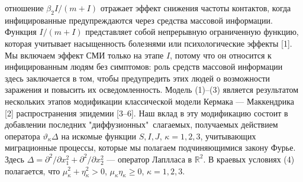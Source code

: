 отношение $\beta_2I/(m+I)$ отражает эффект снижения частоты
контактов, когда инфицированные предупреждаются через средства
массовой информации. Функция $I/(m+I)$ представляет собой
непрерывную ограниченную функцию, которая учитывает насыщенность
болезнями или психологические эффекты [1]. Мы включаем эффект СМИ
только на этапе $I$,  потому что он относится к инфицированным
людям без симптомов: роль средств массовой информации здесь
заключается в том, чтобы предупредить этих людей о возможности
заражения и повысить их осведомленность. Модель (1)--(3) является
результатом нескольких этапов модификации классической модели
Кермака --- Маккендрика [2] распространения эпидемии [3--6]. Наш
вклад в эту модификацию состоит в добавлении последних
"диффузионных"\ слагаемых, получаемых действием оператора
$\vartheta_\kappa\Delta$ на искомые функции $S, I, J$,
$\kappa=1,2,3$, учитывающих миграционные процессы, которые мы
полагаем подчиняющимися закону Фурье. Здесь
$\Delta=\partial^2/\partial x_1^2+\partial^2/\partial x_2^2$ ---
оператор Лаплласа в $\mathbb{R}^2$. В краевых условиях (4)
полагается, что $\mu_\kappa^2+\eta_\kappa^2>0$, $\mu_\kappa
\eta_\kappa\geqslant 0$, $\kappa=1,2,3$.

